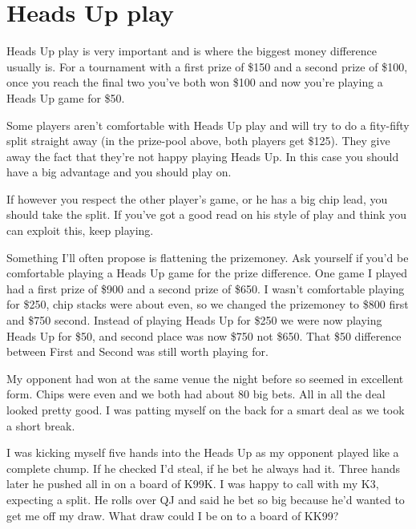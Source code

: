 \chapter{Heads Up play}


Heads Up play is very important and is where the biggest money
difference usually is. For a tournament with
a first prize of \$150 and a second prize of \$100, once
you reach the final two you've both won \$100 and now you're
playing a Heads Up game for \$50.



Some players aren't comfortable with Heads Up play
and will try to do a fity-fifty split straight away (in the prize-pool
above, both players get \$125). They give away the
fact that they're not happy playing Heads Up. In this case
you should have a big advantage and you should play on.

If however you respect the other player's game, or he
has a big chip lead, you should take the split. If you've
got a good read on his style of play and think you
can exploit this, keep playing.

Something I'll often propose is flattening the prizemoney.
Ask yourself if you'd be comfortable playing a Heads Up
game for the prize difference. One game I played had
a first prize of \$900 and a second prize of \$650. I wasn't
comfortable playing for \$250, chip stacks were about even,
so we changed the prizemoney to \$800 first and \$750 second.
Instead of playing Heads Up for \$250 we were now playing
Heads Up for \$50, and second place was now \$750
not \$650. That \$50 difference between
First and Second was still worth playing for.

My opponent had won at the same venue the night before
so seemed in excellent form. Chips were even and we both
had about 80 big bets. All in all the deal looked
pretty good. I was patting myself on the back for a smart
deal as we took a short break.

I was kicking myself five hands into the
Heads Up as my opponent played like a complete chump.
If he checked I'd steal, if he bet he always had it.
Three hands later he pushed all in on a board of K99K.
I was happy to call with my K3, expecting a split.
He rolls over QJ and said he bet so big because he'd
wanted to get me off my draw. What draw could I be
on to a board of KK99?

